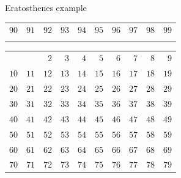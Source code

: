 \documentclass{beamer}
\begin{document}
\begin{frame}[plain]{Eratosthenes example}
{\begin{tabular}{r r r r r r r r r r}
			\color{black} $90$ & \color{black} $91$ & \color{black} $92$ & \color{black} $93$ & \color{black} $94$ & \color{black} $95$ & \color{black} $96$ & \color{black} $97$ & \color{black} $98$ & \color{black} $99$\\
			\phantom{$888$} & \phantom{$888$} & \phantom{$888$} & \phantom{$888$} & \phantom{$888$} & \phantom{$888$} & \phantom{$888$} & \phantom{$888$} & \phantom{$888$} & \phantom{$888$}
        \end{tabular}
	}
	 {
		\begin{tabular}{r r r r r r r r r r}
			                   &                    & \color{ blue}  $2$ & \color{black}  $3$ & \color{black}  $4$ & \color{black}  $5$ & \color{black}  $6$ & \color{black}  $7$ & \color{black}  $8$ & \color{black}  $9$\\
			\color{black} $10$ & \color{black} $11$ & \color{black} $12$ & \color{black} $13$ & \color{black} $14$ & \color{black} $15$ & \color{black} $16$ & \color{black} $17$ & \color{black} $18$ & \color{black} $19$\\
			\color{black} $20$ & \color{black} $21$ & \color{black} $22$ & \color{black} $23$ & \color{black} $24$ & \color{black} $25$ & \color{black} $26$ & \color{black} $27$ & \color{black} $28$ & \color{black} $29$\\
			\color{black} $30$ & \color{black} $31$ & \color{black} $32$ & \color{black} $33$ & \color{black} $34$ & \color{black} $35$ & \color{black} $36$ & \color{black} $37$ & \color{black} $38$ & \color{black} $39$\\
			\color{black} $40$ & \color{black} $41$ & \color{black} $42$ & \color{black} $43$ & \color{black} $44$ & \color{black} $45$ & \color{black} $46$ & \color{black} $47$ & \color{black} $48$ & \color{black} $49$\\
			\color{black} $50$ & \color{black} $51$ & \color{black} $52$ & \color{black} $53$ & \color{black} $54$ & \color{black} $55$ & \color{black} $56$ & \color{black} $57$ & \color{black} $58$ & \color{black} $59$\\
			\color{black} $60$ & \color{black} $61$ & \color{black} $62$ & \color{black} $63$ & \color{black} $64$ & \color{black} $65$ & \color{black} $66$ & \color{black} $67$ & \color{black} $68$ & \color{black} $69$\\
			\color{black} $70$ & \color{black} $71$ & \color{black} $72$ & \color{black} $73$ & \color{black} $74$ & \color{black} $75$ & \color{black} $76$ & \color{black} $77$ & \color{black} $78$ & \color{black} $79$\\

\end{tabular}}
\end{frame}
\end{document}
